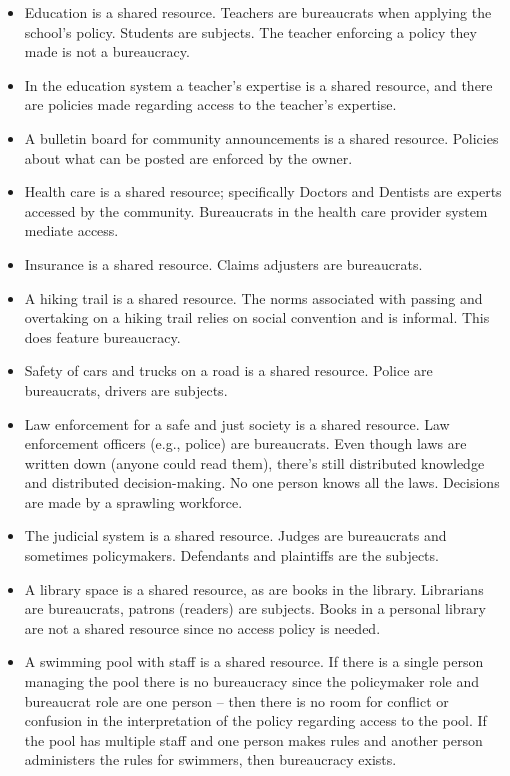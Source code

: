 {{\begin{itemize}
\item Education is a shared resource. Teachers are bureaucrats when applying the school's policy. Students are subjects. The teacher enforcing a policy they made is not a bureaucracy.  
\item In the education system a teacher's expertise is a shared resource, and there are policies made regarding access to the teacher's expertise. 
\item A bulletin board for community announcements is a shared resource. Policies about what can be posted are enforced by the owner.
\item Health care is a shared resource; specifically Doctors and Dentists are experts accessed by the community. Bureaucrats in the health care provider system mediate access.
\item Insurance is a shared resource. Claims adjusters are bureaucrats.
\item A hiking trail is a shared resource. The norms associated with passing and overtaking on a hiking trail
relies on social convention and is informal. This does feature bureaucracy. 
\item Safety of cars and trucks on a road is a shared resource. Police are bureaucrats, drivers are subjects.
\item Law enforcement for a safe and just society is a shared resource. Law enforcement officers (e.g., police) are bureaucrats. 
Even though laws are written down (anyone could read them), there's still distributed knowledge and distributed decision-making. No one person knows all the laws. Decisions are made by a sprawling workforce.
\item The judicial system is a shared resource. Judges are bureaucrats and sometimes policymakers. Defendants and plaintiffs are the subjects. 
\item A library space is a shared resource, as are books in the library. Librarians are bureaucrats, patrons (readers) are subjects. Books in a personal library are not a shared resource since no access policy is needed.
\item A swimming pool with staff is a shared resource. If there is a single person managing the pool there is no bureaucracy since the \gls{policymaker} role and bureaucrat role are one person -- then there is no room for conflict or confusion in the interpretation of the policy regarding access to the pool. If the pool has multiple staff and one person makes rules and another person administers the rules for swimmers, then bureaucracy exists.

\end{itemize}}}
